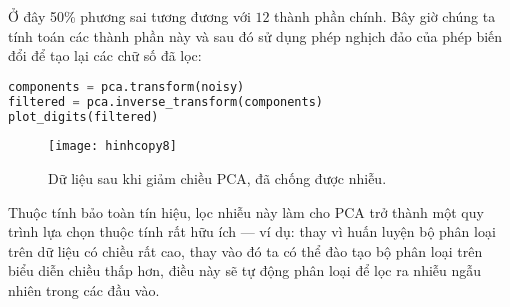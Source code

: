 Ở đây 50\% phương sai tương đương với $12$ thành phần chính. Bây giờ chúng ta tính toán các thành phần này và sau đó sử dụng phép nghịch đảo của phép biến đổi để tạo lại các chữ số đã lọc:
\begin{lstlisting}[language=Python]
components = pca.transform(noisy)
filtered = pca.inverse_transform(components)
plot_digits(filtered)
\end{lstlisting}

\begin{figure}[htb]
	\centering
	\texttt{[image: hinhcopy8]}
	\caption{Dữ liệu sau khi giảm chiều PCA, đã chống được nhiễu.}
	\label{fig:hinhcopy8}
\end{figure}
Thuộc tính bảo toàn tín hiệu, lọc nhiễu này làm cho PCA trở thành một quy trình lựa chọn thuộc tính rất hữu ích — ví dụ: thay vì huấn luyện bộ phân loại trên dữ liệu có chiều rất cao, thay vào đó ta có thể đào tạo bộ phân loại trên biểu diễn chiều thấp hơn, điều này sẽ tự động phân loại để lọc ra nhiễu ngẫu nhiên trong các đầu vào.